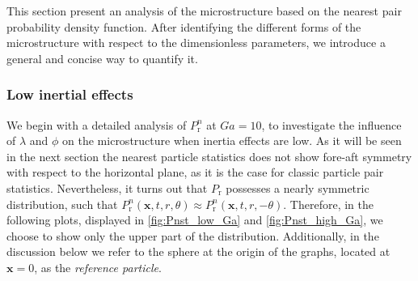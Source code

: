 This section present an analysis of the microstructure based on the nearest pair probability density function.%
After identifying the different forms of the microstructure with respect to the dimensionless parameters, we introduce a general and concise way to quantify it.


\subsubsection*{Low inertial effects }
We begin with a detailed analysis of $P_\text{r}^n$ at $Ga =10$, to investigate the influence of $\lambda$ and $\phi$ on the microstructure when inertia effects are low.
As it will be seen in the next section the nearest particle statistics does not show fore-aft symmetry with respect to the horizontal plane, as it is the case for classic particle pair statistics. 
Nevertheless, it turns out that $P_\text{r}$ possesses a nearly symmetric distribution, such that $P_\text{r}^n(\textbf{x},t,r,\theta)\approx P_\text{r}^n(\textbf{x},t,r,- \theta)$. 
Therefore, in the following plots, displayed in \ref{fig:Pnst_low_Ga} and \ref{fig:Pnst_high_Ga}, we choose to show only the upper part of the distribution.
Additionally, in the discussion below we refer to the sphere at the origin of the graphs, located at $\textbf{x}=0$, as the \textit{reference particle}.%

